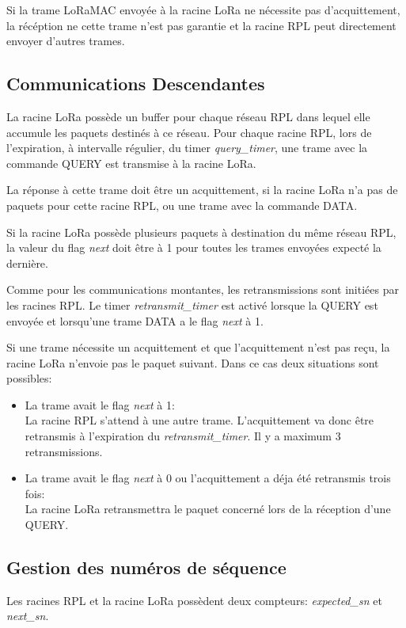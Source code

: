     Si la trame LoRaMAC envoyée à la racine LoRa ne nécessite pas d'acquittement, la récéption ne cette trame n'est pas garantie et la racine RPL peut directement envoyer d'autres trames.

\subsection*{Communications Descendantes}
    La racine LoRa possède un buffer pour chaque réseau RPL dans lequel elle accumule les paquets destinés à ce réseau. Pour chaque racine RPL, lors de l'expiration, à intervalle régulier, du timer \textit{query\_timer}, une trame avec la commande QUERY est transmise à la racine LoRa.

    La réponse à cette trame doit être un acquittement, si la racine LoRa n'a pas de paquets pour cette racine RPL, ou une trame avec la commande DATA.

    Si la racine LoRa possède plusieurs paquets à destination du même réseau RPL, la valeur du flag \textit{next} doit être à 1 pour toutes les trames envoyées expecté la dernière.

    Comme pour les communications montantes, les retransmissions sont initiées par les racines RPL.
    Le timer \textit{retransmit\_timer} est activé lorsque la QUERY est envoyée et lorsqu'une trame DATA a le flag \textit{next} à 1.

    Si une trame nécessite un acquittement et que l'acquittement n'est pas reçu, la racine LoRa n'envoie pas le paquet suivant. Dans ce cas deux situations sont possibles:
    \begin{itemize}
        \item La trame avait le flag \textit{next} à 1:\\
            La racine RPL s'attend à une autre trame. L'acquittement va donc être retransmis à l'expiration du \textit{retransmit\_timer}. Il y a maximum 3 retransmissions.
        \item La trame avait le flag \textit{next} à 0 ou l'acquittement a déja été retransmis trois fois:\\
            La racine LoRa retransmettra le paquet concerné lors de la réception d'une QUERY.
    \end{itemize}

\subsection*{Gestion des numéros de séquence}
    Les racines RPL et la racine LoRa possèdent deux compteurs: \textit{expected\_sn} et \textit{next\_sn}.

